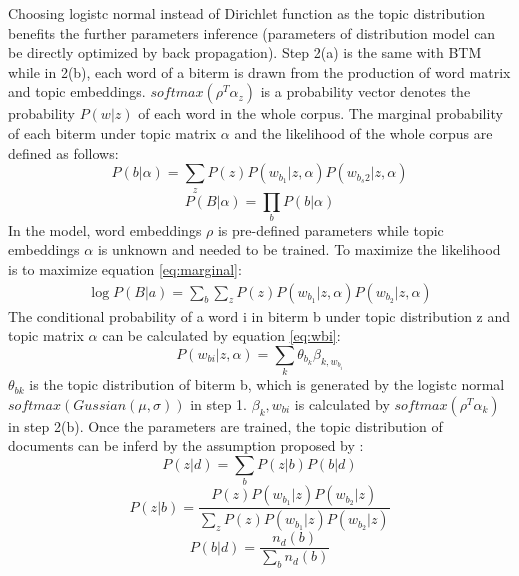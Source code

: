 Choosing logistc normal instead of Dirichlet function as the topic distribution benefits the further parameters inference (parameters of distribution model can be directly optimized by back propagation). Step 2(a) is the same with BTM while in 2(b), each word of a biterm is drawn from the production of word matrix and topic embeddings. $softmax(\rho^T\alpha_z)$ is a probability vector denotes the probability $P(w|z)$ of each word in the whole corpus. The marginal probability of each biterm under topic matrix $\alpha$ and the likelihood of the whole corpus are defined as follows:
\begin{equation}
    P(b|\alpha) = \sum_zP(z)P(w_{b_1}|z,\alpha)P(w_{b_s2}|z,\alpha)
    \label{eq:biterm}
\end{equation}
\begin{equation}
    P(B|\alpha) = \prod_bP(b|\alpha)
    \label{eq:corpus}
\end{equation}
In the model, word embeddings $\rho$ is pre-defined parameters while topic embeddings $\alpha$ is unknown and needed to be trained.
To maximize the likelihood is to maximize equation \ref{eq:marginal}:
\begin{equation}
    \begin{aligned}
        \log P(B|a) = \sum_{b}\sum_zP(z)P(w_{b_1}|z,\alpha)P(w_{b_2}|z,\alpha)
    \end{aligned} 
    \label{eq:marginal}
\end{equation}
The conditional probability of a word i in biterm b under topic distribution z and topic matrix $\alpha$ can be calculated by equation \ref{eq:wbi}:
\begin{equation}
    P(w_{bi}|z,\alpha) = \sum_{k}\theta_{b_k}\beta_{k,w_{b_i}}
\label{eq:wbi}
\end{equation}
$\theta_{bk}$ is the topic distribution of biterm b, which is generated by the logistc normal $softmax(Gussian(\mu,\sigma))$  in step 1. $\beta_k,w_{bi}$ is calculated by $softmax(\rho^T\alpha_k)$ in step 2(b). Once the parameters are trained, the topic distribution of documents can be inferd by the assumption proposed by \cite{yan2013biterm}:
\begin{equation}
    P(z|d) = \sum_bP(z|b)P(b|d)
\label{eq:doc1}
\end{equation}
\begin{equation}
    P(z|b) = \frac{P(z)P(w_{b_1}|z)P(w_{b_2}|z)}{\sum_zP(z)P(w_{b_1}|z)P(w_{b_2}|z)}
\label{eq:doc2}
\end{equation}
\begin{equation}
    P(b|d) = \frac{n_d(b)}{\sum_bn_d(b)}
\label{eq:doc3}
\end{equation}
